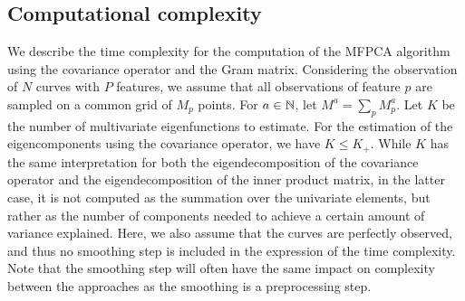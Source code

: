 \subsection{Computational complexity} %
\label{sub:computational_complexity}

We describe the time complexity for the computation of the MFPCA algorithm using the covariance operator and the Gram matrix. Considering the observation of $N$ curves with $P$ features, we assume that all observations of feature $p$ are sampled on a common grid of $M_p$ points. For $a \in \mathbb{N}$, let $M^a = \sum_{p} M_p^a$. Let $K$ be the number of multivariate eigenfunctions to estimate. For the estimation of the eigencomponents using the covariance operator, we have $K \leq K_+$. While $K$ has the same interpretation for both the eigendecomposition of the covariance operator and the eigendecomposition of the inner product matrix, in the latter case, it is not computed as the summation over the univariate elements, but rather as the number of components needed to achieve a certain amount of variance explained. Here, we also assume that the curves are perfectly observed, and thus no smoothing step is included in the expression of the time complexity. Note that the smoothing step will often have the same impact on complexity between the approaches as the smoothing is a preprocessing step.

